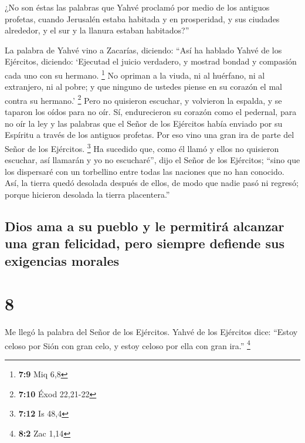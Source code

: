  ¿No son éstas las palabras que Yahvé proclamó por medio
de los antiguos profetas, cuando Jerusalén estaba habitada y en
prosperidad, y sus ciudades alrededor, y el sur y la llanura estaban
habitados?''

 La palabra de Yahvé vino a Zacarías, diciendo:
 ``Así ha hablado Yahvé de los Ejércitos, diciendo:
`Ejecutad el juicio verdadero, y mostrad bondad y compasión cada uno con
su hermano. \footnote{\textbf{7:9} Miq 6,8}  No opriman a
la viuda, ni al huérfano, ni al extranjero, ni al pobre; y que ninguno
de ustedes piense en su corazón el mal contra su hermano.' \footnote{\textbf{7:10}
  Éxod 22,21-22}  Pero no quisieron escuchar, y volvieron
la espalda, y se taparon los oídos para no oír.  Sí,
endurecieron su corazón como el pedernal, para no oír la ley y las
palabras que el Señor de los Ejércitos había enviado por su Espíritu a
través de los antiguos profetas. Por eso vino una gran ira de parte del
Señor de los Ejércitos. \footnote{\textbf{7:12} Is 48,4} 
Ha sucedido que, como él llamó y ellos no quisieron escuchar, así
llamarán y yo no escucharé'', dijo el Señor de los Ejércitos;
 ``sino que los dispersaré con un torbellino entre todas
las naciones que no han conocido. Así, la tierra quedó desolada después
de ellos, de modo que nadie pasó ni regresó; porque hicieron desolada la
tierra placentera.''

\hypertarget{dios-ama-a-su-pueblo-y-le-permitiruxe1-alcanzar-una-gran-felicidad-pero-siempre-defiende-sus-exigencias-morales}{%
\subsection{Dios ama a su pueblo y le permitirá alcanzar una gran
felicidad, pero siempre defiende sus exigencias
morales}\label{dios-ama-a-su-pueblo-y-le-permitiruxe1-alcanzar-una-gran-felicidad-pero-siempre-defiende-sus-exigencias-morales}}

\hypertarget{section-7}{%
\section{8}\label{section-7}}

 Me llegó la palabra del Señor de los Ejércitos.
 Yahvé de los Ejércitos dice: ``Estoy celoso por Sión con
gran celo, y estoy celoso por ella con gran ira.'' \footnote{\textbf{8:2}
  Zac 1,14}

